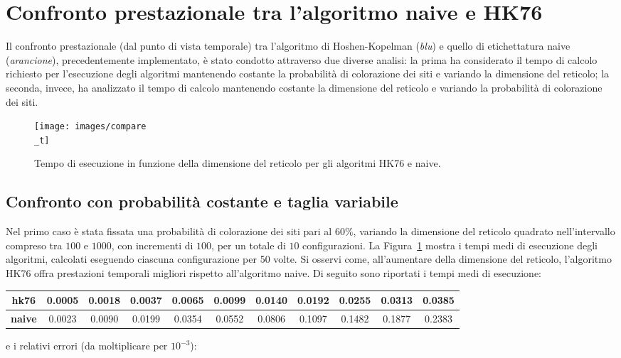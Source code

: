 \section{Confronto prestazionale tra l'algoritmo naive e HK76}
Il confronto prestazionale (dal punto di vista temporale) tra l'algoritmo di Hoshen-Kopelman (\textit{blu}) e quello di etichettatura naive (\textit{arancione}), precedentemente implementato, è stato condotto attraverso due diverse analisi: la prima ha considerato il tempo di calcolo richiesto per l'esecuzione degli algoritmi mantenendo costante la probabilità di colorazione dei siti e variando la dimensione del reticolo; la seconda, invece, ha analizzato il tempo di calcolo mantenendo costante la dimensione del reticolo e variando la probabilità di colorazione dei siti.

\begin{figure}
	\centering
	\texttt{[image: images/compare\\\_t]}
	\caption{Tempo di esecuzione in funzione della dimensione del reticolo per gli algoritmi HK76 e naive.}
	\label{fig:comparet}
\end{figure}
\subsection{Confronto con probabilità costante e taglia variabile}
Nel primo caso è stata fissata una probabilità di colorazione dei siti pari al $60\%$, variando la dimensione del reticolo quadrato nell'intervallo compreso tra $100$ e $1000$, con incrementi di $100$, per un totale di $10$ configurazioni. La Figura~\ref{fig:comparet} mostra i tempi medi di esecuzione degli algoritmi, calcolati eseguendo ciascuna configurazione per 50 volte. Si osservi come, all’aumentare della dimensione del reticolo, l’algoritmo HK76 offra prestazioni temporali migliori rispetto all’algoritmo naive. Di seguito sono riportati i tempi medi di esecuzione:

\vspace{15px}
\noindent
\begin{tabular}{|c|*{10}{c|}}
	\hline
	\textbf{hk76} &0.0005 &	0.0018 &	0.0037 &	0.0065 &	0.0099 &	0.0140 &	0.0192 &	0.0255 &	0.0313 &	0.0385 \\
	\hline
	\textbf{naive} & 0.0023  &  0.0090  &  0.0199 &   0.0354 &   0.0552  &  0.0806 &   0.1097  &  0.1482 &   0.1877  &  0.2383\\
	\hline
\end{tabular}
\newpage
\noindent
e i relativi errori (da moltiplicare per $10^{-3}$):

